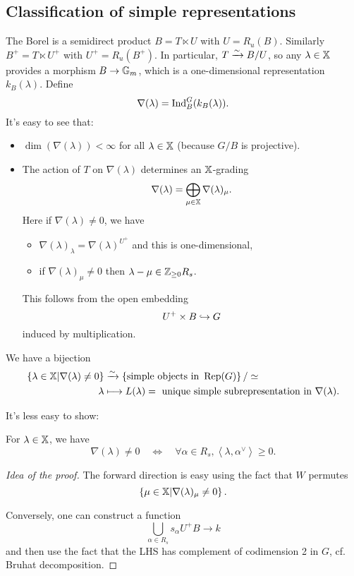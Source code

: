 	\subsection{Classification of simple representations}
	The Borel is a semidirect product $B=T\ltimes U$ with $U=R_u(B)$. Similarly
	$B^{+}=T\ltimes U^{+}$ with $U^{+}=R_u(B^{+})$. In particular, $T\xrightarrow{\sim} B /U$, so any
	$\lambda\in \mathbb{X}$ provides a morphism $B\to \Gm$, which is a one-dimensional
	representation $k_B(\lambda)$. Define
	\[
		\nabla(\lambda) = \operatorname{Ind}_B^{G}(k_B(\lambda)).
	\]
	It's easy to see that:
	\begin{itemize}
		\item $\dim(\nabla(\lambda))<\infty$ for all $\lambda\in \mathbb{X}$ (because $G /B$ is projective).
		\item The action of $T$ on $\nabla(\lambda)$ determines an $\mathbb{X}$-grading
			\[
				\nabla(\lambda) = \bigoplus_{\mu\in \mathbb{X}}\nabla(\lambda)_\mu.
			\]
			Here if $\nabla(\lambda)\neq 0$, we have
			\begin{itemize}
				\item $\nabla(\lambda)_\lambda = \nabla(\lambda)^{U^{+}}$ and this is one-dimensional,
				\item if $\nabla(\lambda)_\mu \neq 0$ then $\lambda-\mu\in \mathbb Z_{\ge 0}R_s$.
			\end{itemize}
			This follows from the open embedding
			\[
				U^{+}\times B\hookrightarrow G
			\]
			induced by multiplication.
	\end{itemize}
	\begin{corollary}
		We have a bijection
		\begin{align*}
			\left\{ \lambda\in \XX \middle| \nabla(\lambda)\neq 0 \right\} &\simto \left\{
			\text{simple objects in }\Rep(G) \right\} /\isoto \\
			\lambda &\mapsto L(\lambda) = \text{ unique simple subrepresentation in }\nabla(\lambda).
		\end{align*}
	\end{corollary}
	It's less easy to show:
	\begin{proposition}
		For $\lambda\in \mathbb{X}$, we have
		\[
			\nabla(\lambda) \neq 0 \quad \iff\quad \forall \alpha\in R_s, \left<\lambda,\alpha
			^{\vee} \right> \ge 0.
		\]
	\end{proposition}
	\begin{proof}[Idea of the proof]
		The forward direction is easy using the fact that $W$ permutes
		\[
			\left\{ \mu\in \mathbb{X} \middle| \nabla(\lambda)_\mu \neq 0 \right\} .
		\]

		Conversely, one can construct a function
		\[
			\bigcup_{\alpha\in R_s} s_\alpha U^{+}B\to k
		\]
		and then use the fact that the LHS has complement of codimension 2 in $G$, cf. Bruhat
		decomposition.
	\end{proof}
